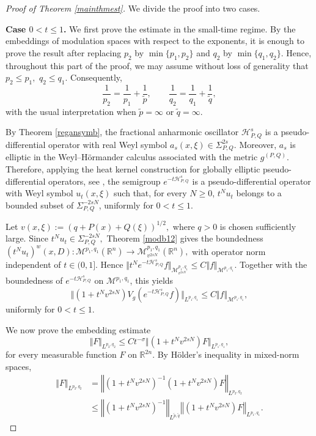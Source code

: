 \documentclass[12pt, reqno]{amsart}
\newcommand{\M}{\mathcal{M}}
\theoremstyle{definition}
\theoremstyle{remark}
\numberwithin{equation}{section}
\newcommand{\APQ}{\mathcal{H}_{P, Q}}
\begin{document}
\begin{proof}[Proof of Theorem \ref{mainthmest}]
We divide the proof into two cases.

\medskip
\noindent\textbf{Case $0<t\leq 1$.}
We first prove the estimate in the small-time regime. By the embeddings of modulation spaces with respect to the exponents, it is enough to prove the result after replacing $p_2$ by $\min\{p_1,p_2\}$ and $q_2$ by $\min\{q_1,q_2\}$. Hence, throughout this part of the proof, we may assume without loss of generality that $p_2\leq p_1,\,\,
q_2\leq q_1.$
Consequently,
\[
\frac1{p_2}=\frac1{p_1}+\frac1{\widetilde p},
\qquad
\frac1{q_2}=\frac1{q_1}+\frac1{\widetilde q},
\]
with the usual interpretation when $\widetilde p=\infty$ or $\widetilde q=\infty$.

By Theorem \ref{regansymb}, the fractional anharmonic oscillator $\APQ^s$ is a pseudo-differential operator with real Weyl symbol $a_s(x,\xi)\in \Sigma_{P,Q}^{2s}.$
Moreover, $a_s$ is elliptic in the Weyl--H\"ormander calculus associated with the metric $g^{(P,Q)}$. Therefore, applying the heat kernel construction for globally elliptic pseudo-differential operators, see \cite[Theorem 4.5.1]{NicolaRodino}, the semigroup $e^{-t\APQ^s}$ is a pseudo-differential operator with Weyl symbol $u_t(x,\xi)$ such that, for every $N\geq 0$, $t^Nu_t$
belongs to a bounded subset of $\Sigma_{P,Q}^{-2sN}$, uniformly for $0<t\leq 1$.

Let $v(x,\xi):=(q+P(x)+Q(\xi))^{1/2},$
where $q>0$ is chosen sufficiently large. Since $t^Nu_t\in \Sigma_{P,Q}^{-2sN},$
Theorem \ref{modb12} gives the boundedness $(t^Nu_t)^w(x,D):
\M^{p_1,q_1}(\mathbb{R}^n)
\longrightarrow
\M_{v^{2sN}}^{p_1,q_1}(\mathbb{R}^n),$
with operator norm independent of $t\in(0,1]$. Hence $\Vert t^N e^{-t\APQ^s}f\Vert_{\M_{v^{2sN}}^{p_1,q_1}}
\leq
C\Vert f\Vert_{\M^{p_1,q_1}}.$
Together with the boundedness of $e^{-t\APQ^s}$ on $\M^{p_1,q_1}$, this yields
\begin{equation}
\label{weighted-stft-bound}
\Vert
(1+t^Nv^{2sN})V_g(e^{-t\APQ^s}f)
\Vert_{L^{p_1,q_1}}
\leq
C
\Vert f\Vert_{\M^{p_1,q_1}},
\end{equation}
uniformly for $0<t\leq 1$.

We now prove the embedding estimate
\begin{equation}
\label{aux456}
\Vert F\Vert_{L^{p_2,q_2}}
\leq
C t^{-\sigma}
\Vert
(1+t^Nv^{2sN})F
\Vert_{L^{p_1,q_1}},
\end{equation}
for every measurable function $F$ on $\mathbb{R}^{2n}$. By H\"older's inequality in mixed-norm spaces,
\begin{align*}
\Vert F\Vert_{L^{p_2,q_2}}
&=
\left\Vert
(1+t^Nv^{2sN})^{-1}
(1+t^Nv^{2sN})F
\right\Vert_{L^{p_2,q_2}}
\\
&\leq
\left\Vert
(1+t^Nv^{2sN})^{-1}
\right\Vert_{L^{\widetilde p,\widetilde q}}
\left\Vert
(1+t^Nv^{2sN})F
\right\Vert_{L^{p_1,q_1}}.
\end{align*}


\end{proof}
\end{document}

